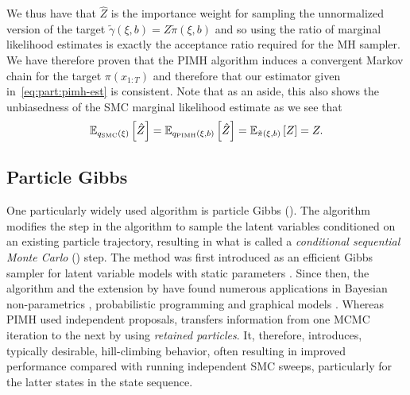 We thus have that $\hat{Z}$ is the importance weight for sampling the unnormalized
version of the target $\tilde{\gamma}(\xi,b) = Z \tilde{\pi}(\xi,b)$ and so using the
ratio of marginal likelihood estimates is exactly the acceptance ratio required for
the MH sampler.  We
have therefore proven that the PIMH algorithm induces a convergent Markov chain for
the target $\pi(x_{1:T})$ and therefore that our estimator given in~\eqref{eq:part:pimh-est} is
consistent.
Note that as an aside, this also shows the unbiasedness of the SMC marginal likelihood estimate
as we see that
\begin{align}
\mathbb{E}_{q_{\text{SMC}}(\mathbf{\xi})} \left[\hat{Z}\right] = \mathbb{E}_{q_{\text{PIMH}}(\mathbf{\xi},b)} 
\left[\hat{Z}\right]=\mathbb{E}_{\tilde{\pi}(\xi,b)} \left[Z\right]=Z.
\end{align}

\subsection{Particle Gibbs}
\label{sec:part:pmcmc:pgibbs}

One particularly widely used \pmcmc algorithm is particle Gibbs (\pg). The \pg algorithm modifies the 
\smc step in the \pmcmc algorithm to sample the latent variables conditioned on an existing particle
 trajectory, resulting in what is called a \emph{conditional sequential Monte Carlo} (\csmc) step. The \pg method
  was first introduced as an efficient Gibbs sampler for latent variable models with static parameters 
  \citep{andrieuDH2010}. Since then, the \pg algorithm and the extension by \citet{lindstenJS2014} have 
  found numerous applications in \eg Bayesian non-parametrics \citep{ValeraFSPC2015,tripuraneni2015}, 
  probabilistic programming \citep{wood2014new,vandemeent_aistats_2015} and graphical models 
  \citep{everitt2012,naessethLS2014,naessethLS2015nested}.  Whereas PIMH used independent proposals, 
  \pg transfers information from one MCMC iteration to the next by using \emph{retained particles}.  It, therefore,
  introduces, typically desirable, hill-climbing behavior, often resulting in improved performance
  compared with running independent SMC sweeps, particularly for the latter states in the state sequence.

